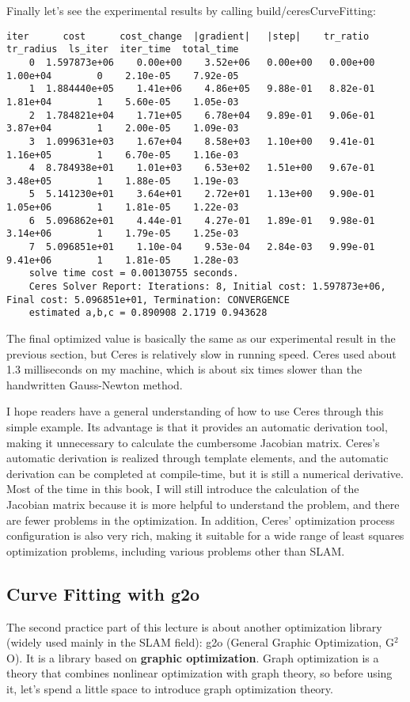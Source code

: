 Finally let's see the experimental results by calling build/ceresCurveFitting: 
\begin{lstlisting}[caption=terminal output: ]
    iter      cost      cost_change  |gradient|   |step|    tr_ratio  tr_radius  ls_iter  iter_time  total_time
    0  1.597873e+06    0.00e+00    3.52e+06   0.00e+00   0.00e+00  1.00e+04        0    2.10e-05    7.92e-05
    1  1.884440e+05    1.41e+06    4.86e+05   9.88e-01   8.82e-01  1.81e+04        1    5.60e-05    1.05e-03
    2  1.784821e+04    1.71e+05    6.78e+04   9.89e-01   9.06e-01  3.87e+04        1    2.00e-05    1.09e-03
    3  1.099631e+03    1.67e+04    8.58e+03   1.10e+00   9.41e-01  1.16e+05        1    6.70e-05    1.16e-03
    4  8.784938e+01    1.01e+03    6.53e+02   1.51e+00   9.67e-01  3.48e+05        1    1.88e-05    1.19e-03
    5  5.141230e+01    3.64e+01    2.72e+01   1.13e+00   9.90e-01  1.05e+06        1    1.81e-05    1.22e-03
    6  5.096862e+01    4.44e-01    4.27e-01   1.89e-01   9.98e-01  3.14e+06        1    1.79e-05    1.25e-03
    7  5.096851e+01    1.10e-04    9.53e-04   2.84e-03   9.99e-01  9.41e+06        1    1.81e-05    1.28e-03
    solve time cost = 0.00130755 seconds. 
    Ceres Solver Report: Iterations: 8, Initial cost: 1.597873e+06, Final cost: 5.096851e+01, Termination: CONVERGENCE
    estimated a,b,c = 0.890908 2.1719 0.943628 
\end{lstlisting}

The final optimized value is basically the same as our experimental result in the previous section, but Ceres is relatively slow in running speed. Ceres used about 1.3 milliseconds on my machine, which is about six times slower than the handwritten Gauss-Newton method.

I hope readers have a general understanding of how to use Ceres through this simple example. Its advantage is that it provides an automatic derivation tool, making it unnecessary to calculate the cumbersome Jacobian matrix. Ceres's automatic derivation is realized through template elements, and the automatic derivation can be completed at compile-time, but it is still a numerical derivative. Most of the time in this book, I will still introduce the calculation of the Jacobian matrix because it is more helpful to understand the problem, and there are fewer problems in the optimization. In addition, Ceres' optimization process configuration is also very rich, making it suitable for a wide range of least squares optimization problems, including various problems other than SLAM.

\subsection{Curve Fitting with g2o}
The second practice part of this lecture is about another optimization library (widely used mainly in the SLAM field): g2o (General Graphic Optimization, G$^2$O). It is a library based on \textbf{graphic optimization}. Graph optimization is a theory that combines nonlinear optimization with graph theory, so before using it, let's spend a little space to introduce graph optimization theory.

